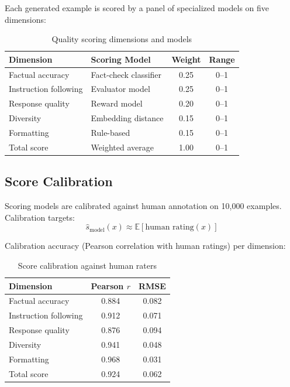 \documentclass[11pt,a4paper]{article}
\begin{document}
Each generated example is scored by a panel of specialized models on five dimensions:

\begin{table}[H]
\centering
\caption{Quality scoring dimensions and models}
\label{tab:scoring}
\begin{tabular}{llcc}
\toprule
Dimension & Scoring Model & Weight & Range \\
\midrule
Factual accuracy & Fact-check classifier & 0.25 & 0--1 \\
Instruction following & Evaluator model & 0.25 & 0--1 \\
Response quality & Reward model & 0.20 & 0--1 \\
Diversity & Embedding distance & 0.15 & 0--1 \\
Formatting & Rule-based & 0.15 & 0--1 \\
\midrule
Total score & Weighted average & 1.00 & 0--1 \\
\bottomrule
\end{tabular}
\end{table}

\subsection{Score Calibration}

Scoring models are calibrated against human annotation on 10,000 examples. Calibration targets:
\begin{equation}
\hat{s}_{\text{model}}(x) \approx \mathbb{E}[\text{human rating}(x)]
\end{equation}

Calibration accuracy (Pearson correlation with human ratings) per dimension:

\begin{table}[H]
\centering
\caption{Score calibration against human raters}
\label{tab:calibration}
\begin{tabular}{lcc}
\toprule
Dimension & Pearson $r$ & RMSE \\
\midrule
Factual accuracy & 0.884 & 0.082 \\
Instruction following & 0.912 & 0.071 \\
Response quality & 0.876 & 0.094 \\
Diversity & 0.941 & 0.048 \\
Formatting & 0.968 & 0.031 \\
\midrule
Total score & 0.924 & 0.062 \\
\bottomrule
\end{tabular}
\end{table}
\end{document}

